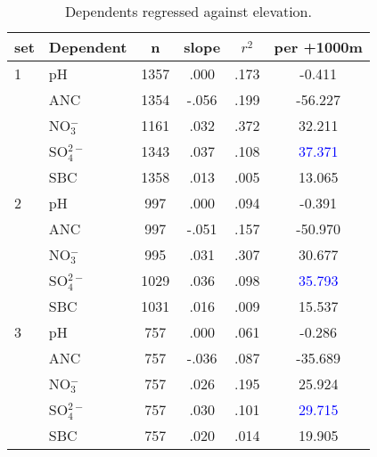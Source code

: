 \begin{table}[htbp]\scriptsize
\centering
\caption[Elevation trends]{Dependents regressed against elevation.}
\begin{tabular}{llcccc}
\toprule
set & Dependent & n & slope&$r^2$&per +1000m \\ 
\midrule
1   & pH               & 1357 & .000 & .173 & -0.411  \\ 
     & ANC            & 1354 & -.056 & .199 & -56.227  \\ 
     &  NO$_3^-$ & 1161 & .032 & .372 & 32.211  \\ 
     &  SO$_4^{2-}$& 1343 & .037 & .108 & \textcolor{blue}{37.371}  \\ 
     & SBC             & 1358 & .013 & .005 & 13.065  \\ 
\midrule
2   & pH               & 997 & .000 & .094 & -0.391  \\ 
     & ANC            & 997 & -.051 & .157 & -50.970  \\ 
     &  NO$_3^-$  & 995 & .031 & .307 & 30.677  \\ 
     &  SO$_4^{2-}$ & 1029 & .036 & .098 & \textcolor{blue}{35.793}  \\ 
     & SBC             & 1031 & .016 & .009 & 15.537  \\ 
 \midrule
3   & pH              & 757 & .000 & .061 & -0.286  \\ 
     & ANC           & 757 & -.036 & .087 & -35.689  \\ 
     &  NO$_3^-$ & 757 & .026 & .195 & 25.924  \\ 
     &  SO$_4^{2-}$ & 757 & .030 & .101 & \textcolor{blue}{29.715}  \\ 
     & SBC            & 757 & .020 & .014 & 19.905  \\ 
 \bottomrule
\end{tabular}
\label{Water quality per elevation}
\end{table}
